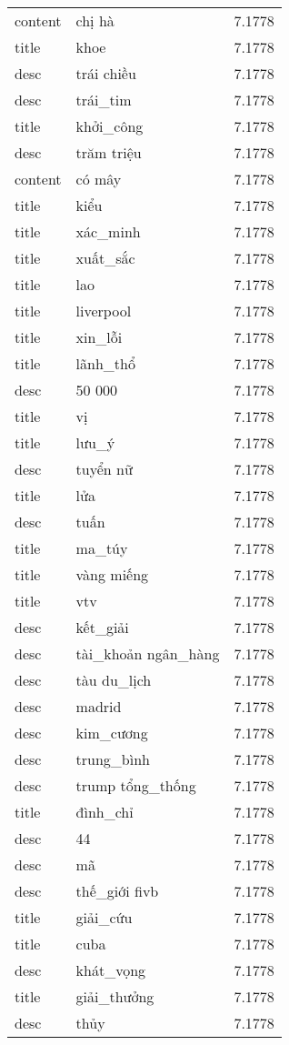\documentclass{article}
\begin{document}
\begin{tabular}{lll}
content & chị hà & 7.1778\\
title & khoe & 7.1778\\
desc & trái chiều & 7.1778\\
desc & trái\_tim & 7.1778\\
title & khởi\_công & 7.1778\\
desc & trăm triệu & 7.1778\\
content & có mây & 7.1778\\
title & kiểu & 7.1778\\
title & xác\_minh & 7.1778\\
title & xuất\_sắc & 7.1778\\
title & lao & 7.1778\\
title & liverpool & 7.1778\\
title & xin\_lỗi & 7.1778\\
title & lãnh\_thổ & 7.1778\\
desc & 50 000 & 7.1778\\
title & vị & 7.1778\\
title & lưu\_ý & 7.1778\\
desc & tuyển nữ & 7.1778\\
title & lửa & 7.1778\\
desc & tuấn & 7.1778\\
title & ma\_túy & 7.1778\\
title & vàng miếng & 7.1778\\
title & vtv & 7.1778\\
desc & kết\_giải & 7.1778\\
desc & tài\_khoản ngân\_hàng & 7.1778\\
desc & tàu du\_lịch & 7.1778\\
desc & madrid & 7.1778\\
desc & kim\_cương & 7.1778\\
desc & trung\_bình & 7.1778\\
desc & trump tổng\_thống & 7.1778\\
title & đình\_chỉ & 7.1778\\
desc & 44 & 7.1778\\
desc & mã & 7.1778\\
desc & thế\_giới fivb & 7.1778\\
title & giải\_cứu & 7.1778\\
title & cuba & 7.1778\\
desc & khát\_vọng & 7.1778\\
title & giải\_thưởng & 7.1778\\
desc & thủy & 7.1778\\

\end{tabular}
\end{document}
